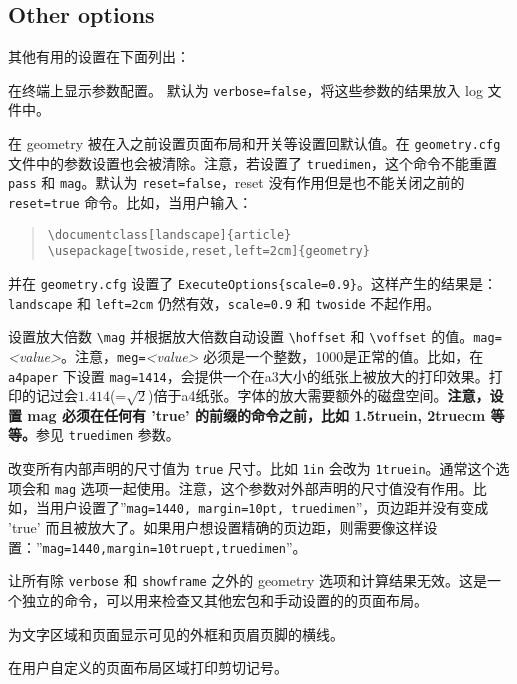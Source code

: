 \documentclass[titlepage]{ctexart}
\def\Gm{\textsf{geometry}}
\def\onlypre{\llap{$^{\dagger\:}$}}%
\newenvironment{Options}%
  {\begin{list}{}{%
   \renewcommand{\makelabel}[1]{\texttt{##1}\hfil}%
   \setlength{\itemsep}{-.5\parsep}
   \settowidth{\labelwidth}{\texttt{xxxxxxxxxxx\space}}%
   \setlength{\leftmargin}{\labelwidth}%
   \addtolength{\leftmargin}{\labelsep}}%
   \raggedright}
  {\end{list}}
\begin{document}
\subsection{Other options}
	其他有用的设置在下面列出：	
	\begin{Options}
	\item[\onlypre verbose] 在终端上显示参数配置。
	默认为 \verb|verbose=false|，将这些参数的结果放入 log 文件中。
	\item[\onlypre reset] 在 \Gm{} 被在入之前设置页面布局和开关等设置回默认值。在 \verb|geometry.cfg| 文件中的参数设置也会被清除。注意，若设置了 \verb|truedimen|，这个命令不能重置 \verb|pass| 和 \verb|mag|。默认为 \verb|reset=false|，reset 没有作用但是也不能关闭之前的 \verb|reset=true| 命令。比如，当用户输入：
	\begin{quote}
	\verb|\documentclass[landscape]{article}|\\
	\verb|\usepackage[twoside,reset,left=2cm]{geometry}|
	\end{quote}
	并在 \verb|geometry.cfg| 设置了 \verb|ExecuteOptions{scale=0.9}|。这样产生的结果是：\verb|landscape| 和 \verb|left=2cm| 仍然有效，\verb|scale=0.9| 和 \verb|twoside| 不起作用。
	\item[\onlypre mag] 设置放大倍数 \verb|\mag| 并根据放大倍数自动设置 \verb|\hoffset| 和 \verb|\voffset| 的值。\verb|mag=|\emph{<value>}。注意，\verb|meg=|\emph{<value>} 必须是一个整数，1000是正常的值。比如，在 \verb|a4paper| 下设置 \verb|mag=1414|，会提供一个在a3大小的纸张上被放大的打印效果。打印的记过会$1.414$(=$\sqrt{2}$)倍于a4纸张。字体的放大需要额外的磁盘空间。\textbf{注意，设置 mag 必须在任何有 'true' 的前缀的命令之前，比如 1.5truein, 2truecm 等等。}参见 \verb|truedimen| 参数。
	\item[\onlypre truedimen] 改变所有内部声明的尺寸值为 \verb|true| 尺寸。比如 \verb|1in| 会改为 \verb|1truein|。通常这个选项会和 \verb|mag| 选项一起使用。注意，这个参数对外部声明的尺寸值没有作用。比如，当用户设置了''\texttt{mag=1440, margin=10pt, truedimen}''，页边距并没有变成 'true' 而且被放大了。如果用户想设置精确的页边距，则需要像这样设置：''\texttt{mag=1440,margin=10truept,truedimen}''。
	\item[\onlypre pass] 让所有除 \verb|verbose| 和 \verb|showframe| 之外的 \Gm{} 选项和计算结果无效。这是一个独立的命令，可以用来检查又其他宏包和手动设置的的页面布局。
	\item[\onlypre showframe] 为文字区域和页面显示可见的外框和页眉页脚的横线。
	\item[\onlypre showcrop] 在用户自定义的页面布局区域打印剪切记号。
	\end{Options} 
	
\end{document}
